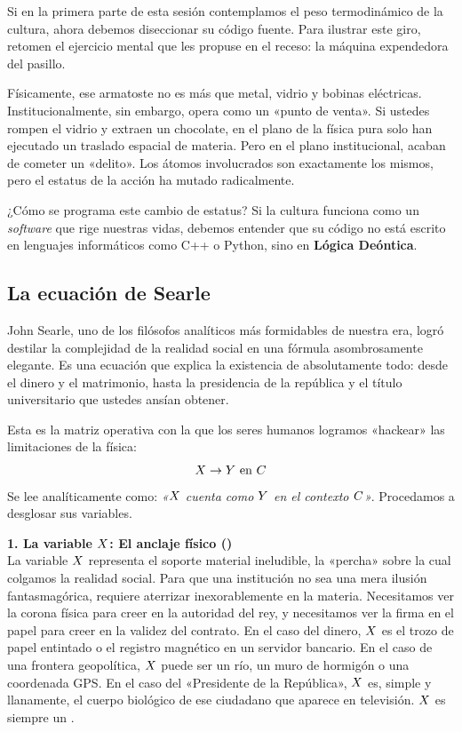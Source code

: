 Si en la primera parte de esta sesión contemplamos el peso termodinámico de la cultura, ahora debemos diseccionar su código fuente. Para ilustrar este giro, retomen el ejercicio mental que les propuse en el receso: la máquina expendedora del pasillo. 

Físicamente, ese armatoste no es más que metal, vidrio y bobinas eléctricas. Institucionalmente, sin embargo, opera como un «punto de venta». Si ustedes rompen el vidrio y extraen un chocolate, en el plano de la física pura solo han ejecutado un traslado espacial de materia. Pero en el plano institucional, acaban de cometer un «delito». Los átomos involucrados son exactamente los mismos, pero el estatus de la acción ha mutado radicalmente. 

¿Cómo se programa este cambio de estatus? Si la cultura funciona como un \textit{software} que rige nuestras vidas, debemos entender que su código no está escrito en lenguajes informáticos como C++ o Python, sino en \textbf{Lógica Deóntica}. 

\subsection{La ecuación de Searle}

John Searle, uno de los filósofos analíticos más formidables de nuestra era, logró destilar la complejidad de la realidad social en una fórmula asombrosamente elegante. Es una ecuación que explica la existencia de absolutamente todo: desde el dinero y el matrimonio, hasta la presidencia de la república y el título universitario que ustedes ansían obtener. 

Esta es la matriz operativa con la que los seres humanos logramos «hackear» las limitaciones de la física:
\begin{equation}
    X \to Y \text{ en } C
\end{equation}
Se lee analíticamente como: \textit{«$X$ cuenta como $Y$ en el contexto $C$»}. Procedamos a desglosar sus variables.

\begin{argumento}
\textbf{1. La variable $X$: El anclaje físico (\HechoBruto)}\\
La variable $X$ representa el soporte material ineludible, la «percha» sobre la cual colgamos la realidad social. Para que una institución no sea una mera ilusión fantasmagórica, requiere aterrizar inexorablemente en la materia. Necesitamos ver la corona física para creer en la autoridad del rey, y necesitamos ver la firma en el papel para creer en la validez del contrato. En el caso del dinero, $X$ es el trozo de papel entintado o el registro magnético en un servidor bancario. En el caso de una frontera geopolítica, $X$ puede ser un río, un muro de hormigón o una coordenada GPS. En el caso del «Presidente de la República», $X$ es, simple y llanamente, el cuerpo biológico de ese ciudadano que aparece en televisión. $X$ es siempre un \HechoBruto.
\end{argumento}

